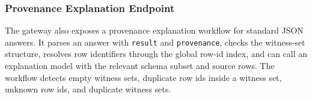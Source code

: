 \documentclass[11pt,a4paper]{article}
\begin{document}
\subsubsection{Provenance Explanation Endpoint}

The gateway also exposes a provenance explanation workflow for standard JSON
answers. It parses an answer with \texttt{result} and \texttt{provenance}, checks
the witness-set structure, resolves row identifiers through the global row-id
index, and can call an explanation model with the relevant schema subset and
source rows. The workflow detects empty witness sets, duplicate row ids inside a
witness set, unknown row ids, and duplicate witness sets.



\end{document}

